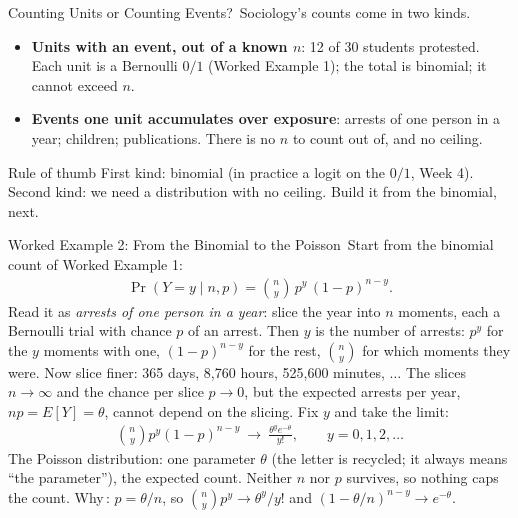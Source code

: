 \documentclass[aspectratio=169,11pt,xcolor=dvipsnames]{beamer}
\newcommand{\E}{E}
\newcommand{\adv}{\,\raisebox{0.6pt}{\textcolor{accent}{$\bigstar$}}}
\newcommand{\core}{\,\raisebox{0.6pt}{\textcolor{corestar}{$\bigstar$}}}
\begin{document}
\begin{frame}{Counting Units or Counting Events?\core}
Sociology's counts come in two kinds.
\begin{itemize}\itemsep5pt
  \item \textbf{Units with an event, out of a known $n$}: 12 of 30 students
        protested. Each unit is a Bernoulli $0/1$ (Worked Example 1); the
        total is binomial; it cannot exceed $n$.
  \item \textbf{Events one unit accumulates over exposure}: arrests of one
        person in a year; children; publications. There is no $n$ to count
        out of, and no ceiling.
\end{itemize}
\vskip6pt
\begin{block}{Rule of thumb}
First kind: binomial (in practice a logit on the $0/1$, Week 4). Second
kind: we need a distribution with no ceiling. Build it from the binomial,
next.
\end{block}
\end{frame}

\begin{frame}{Worked Example 2: From the Binomial to the Poisson\core}
Start from the binomial count of Worked Example 1:
\begingroup\setlength{\abovedisplayskip}{2pt}\setlength{\belowdisplayskip}{2pt}
\begin{align*}
  \Pr(Y = y \mid n, p) = \binom{n}{y}\,p^{y}\,(1-p)^{n-y} .
\end{align*}
\endgroup
Read it as \emph{arrests of one person in a year}: slice the year into $n$
moments, each a Bernoulli trial with chance $p$ of an arrest. Then $y$ is
the number of arrests: $p^{y}$ for the $y$ moments with one, $(1-p)^{n-y}$
for the rest, $\binom{n}{y}$ for which moments they were.
\vskip2pt
Now slice finer: 365 days, 8{,}760 hours, 525{,}600 minutes, $\dots$ The
slices $n \to \infty$ and the chance per slice $p \to 0$, but the expected
arrests per year, $np = \E[Y] = \theta$, cannot depend on the slicing. Fix
$y$ and take the limit:
\begingroup\setlength{\abovedisplayskip}{2pt}\setlength{\belowdisplayskip}{2pt}
\begin{align*}
  \binom{n}{y}p^{y}(1-p)^{n-y} \ \longrightarrow\
  \frac{\theta^{y}e^{-\theta}}{y!}, \qquad y = 0, 1, 2, \dots
\end{align*}
\endgroup
The \alert{Poisson distribution}: one parameter $\theta$ (the letter is
recycled; it always means ``the parameter''), the expected count. Neither
$n$ nor $p$ survives, so nothing caps the count.
\vskip-3pt
{\footnotesize Why\adv: $p = \theta/n$, so $\binom{n}{y}p^{y} \to \theta^{y}/y!$
and $(1-\theta/n)^{n-y} \to e^{-\theta}$.}
\end{frame}
\end{document}
